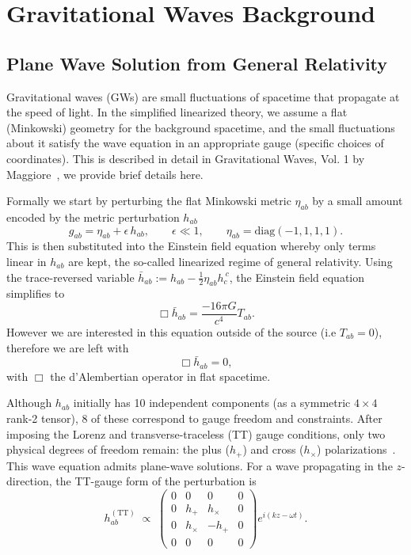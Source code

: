 \documentclass{ucdgradtaughtthesis}
\begin{document}
\tableofcontents
\listoffigures
\listoftables

\clearpage
{}
\pagestyle{fancy}


\chapter{Gravitational Waves Background}
\section{Plane Wave Solution from General Relativity}
\label{sec:GRintro}
Gravitational waves (GWs) are small fluctuations of spacetime that propagate at the speed of light. In the simplified linearized theory, we assume a flat (Minkowski) geometry for the background spacetime, and the small fluctuations about it satisfy the wave equation in an appropriate gauge (specific choices of coordinates). This is described in detail in Gravitational Waves, Vol. 1 by Maggiore~\cite[Sec~ 1.1]{GRbook}, we provide brief
details here.

Formally we start by perturbing the flat Minkowski metric $\eta _{a b}$ by a small amount encoded by
the metric perturbation $h_{a   b}$
\begin{equation}
g_{ab} = \eta_{ab} + \epsilon\,h_{ab},
\qquad
\epsilon \ll 1,
\qquad
\eta_{ab} = \mathrm{diag}(-1, 1, 1, 1).
\end{equation}
This is then substituted into the Einstein field equation whereby only terms linear in $h_{ab}$ are kept,
the so-called linearized regime of general relativity. 
Using the trace-reversed variable $\bar{h}_{ab}:= h_{ab}-\tfrac{1}{2} \eta_{ab} h_c^{\ c}$,
the Einstein field equation simplifies to
\begin{equation}
    \Box \bar{h}_{ab} = \frac{-16\pi G}{c^4} T_{ab}.
\end{equation}
However we are interested in this equation outside of the source (i.e $T_{ab} =0$), therefore we are left with 
\begin{equation}
    \Box \bar{h}_{ab} = 0, 
\end{equation}
with \(\Box\) the d’Alembertian operator in flat spacetime.
%

Although \(h_{ab}\) initially has 10 independent components (as a symmetric $4 \times 4$ rank-2 tensor), 8 of these correspond to gauge freedom and constraints. After imposing the Lorenz and transverse-traceless (TT) gauge conditions, only two physical degrees of freedom remain: the plus (\(h_+\)) and cross (\(h_\times\)) polarizations~\cite[Sec.~1.2]{GRbook}.
This wave equation admits plane-wave solutions. For a wave propagating in the \(z\)-direction, the TT-gauge form of the perturbation is
\begin{equation}
h_{ab}^{(\mathrm{TT})} \;\propto\;
\begin{pmatrix}
0 & 0 & 0 & 0 \\
0 & h_+ & h_\times & 0 \\
0 & h_\times & -h_+ & 0 \\
0 & 0 & 0 & 0
\end{pmatrix}
e^{i(kz-\omega t)}.
\end{equation}
\end{document}
